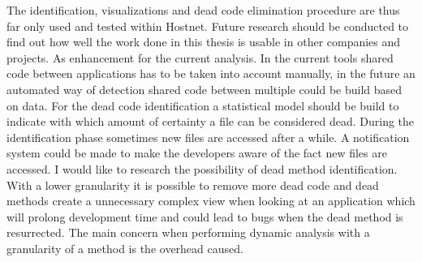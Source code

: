 The identification, visualizations and dead code elimination procedure are thus far only used and tested within Hostnet. Future research should be conducted to find out how well the work done in this thesis is usable in other companies and projects. As enhancement for the current analysis. In the current tools shared code between applications has to be taken into account manually, in the future an automated way of detection shared code between multiple could be build based on \vcs data. For the dead code identification a statistical model should be build to indicate with which amount of certainty a file can be considered dead. During the identification phase sometimes new files are accessed after a while. A notification system could be made to make the developers aware of the fact new files are accessed. I would like to research the possibility of dead method identification. With a lower granularity it is possible to remove more dead code and dead methods create a unnecessary complex view when looking at an application which will prolong development time and could lead to bugs when the dead method is resurrected. The main concern when performing dynamic analysis with a granularity of a method is the overhead caused.